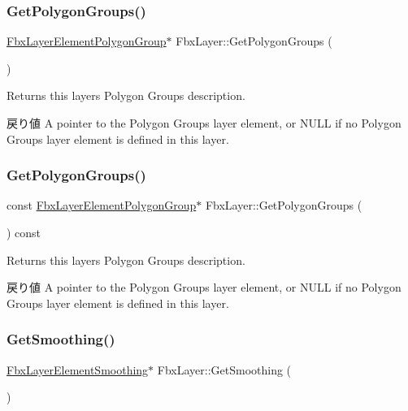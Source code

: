 \subsubsection{\texorpdfstring{Get\+Polygon\+Groups()}{GetPolygonGroups()}\hspace{0.1cm}{\footnotesize\ttfamily [1/2]}}
{\footnotesize\ttfamily \hyperlink{class_fbx_layer_element_polygon_group}{Fbx\+Layer\+Element\+Polygon\+Group}$\ast$ Fbx\+Layer\+::\+Get\+Polygon\+Groups (\begin{DoxyParamCaption}{ }\end{DoxyParamCaption})}

Returns this layer\textquotesingle{}s Polygon Groups description. \begin{DoxyReturn}{戻り値}
A pointer to the Polygon Groups layer element, or {\ttfamily N\+U\+LL} if no Polygon Groups layer element is defined in this layer. 
\end{DoxyReturn}
\mbox{\label{class_fbx_layer_ad8b69cfe2c06bada21d0643e9018774b}} 
\subsubsection{\texorpdfstring{Get\+Polygon\+Groups()}{GetPolygonGroups()}\hspace{0.1cm}{\footnotesize\ttfamily [2/2]}}
{\footnotesize\ttfamily const \hyperlink{class_fbx_layer_element_polygon_group}{Fbx\+Layer\+Element\+Polygon\+Group}$\ast$ Fbx\+Layer\+::\+Get\+Polygon\+Groups (\begin{DoxyParamCaption}{ }\end{DoxyParamCaption}) const}

Returns this layer\textquotesingle{}s Polygon Groups description. \begin{DoxyReturn}{戻り値}
A pointer to the Polygon Groups layer element, or {\ttfamily N\+U\+LL} if no Polygon Groups layer element is defined in this layer. 
\end{DoxyReturn}
\mbox{\label{class_fbx_layer_ada25c7852f5f38e9a053b29858f450c8}} 
\subsubsection{\texorpdfstring{Get\+Smoothing()}{GetSmoothing()}\hspace{0.1cm}{\footnotesize\ttfamily [1/2]}}
{\footnotesize\ttfamily \hyperlink{class_fbx_layer_element_smoothing}{Fbx\+Layer\+Element\+Smoothing}$\ast$ Fbx\+Layer\+::\+Get\+Smoothing (\begin{DoxyParamCaption}{ }\end{DoxyParamCaption})}


